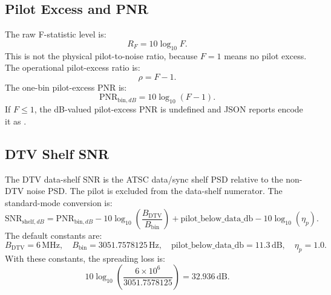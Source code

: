 \documentclass[10pt,letterpaper]{article}
\newcommand{\code}[1]{\texttt{\detokenize{#1}}}
\newcommand{\dB}{\,\mathrm{dB}}
\begin{document}
\subsection{Pilot Excess and PNR}

The raw F-statistic level is:
\begin{equation}
  R_F=10\log_{10}F.
\end{equation}
This is not the physical pilot-to-noise ratio, because \(F=1\) means no pilot excess.  The operational pilot-excess ratio is:
\begin{equation}
  \boxed{\rho=F-1.}
\end{equation}
The one-bin pilot-excess PNR is:
\begin{equation}
  \boxed{\mathrm{PNR}_{\mathrm{bin},dB}=10\log_{10}(F-1).}
\end{equation}
If \(F\leq 1\), the dB-valued pilot-excess PNR is undefined and JSON reports encode it as \code{null}.

\subsection{DTV Shelf SNR}

The DTV data-shelf SNR is the ATSC data/sync shelf PSD relative to the non-DTV noise PSD.  The pilot is excluded from the data-shelf numerator.  The standard-mode conversion is:
\begin{equation}
  \boxed{\mathrm{SNR}_{\mathrm{shelf},dB}=
  \mathrm{PNR}_{\mathrm{bin},dB}
  -10\log_{10}\left(\frac{B_{\mathrm{DTV}}}{B_{\mathrm{bin}}}\right)
  +\mathrm{pilot\_below\_data\_db}
  -10\log_{10}(\eta_p).}
\end{equation}
The default constants are:
\begin{equation}
 B_{\mathrm{DTV}}=6\,\mathrm{MHz},\quad
 B_{\mathrm{bin}}=3051.7578125\,\mathrm{Hz},\quad
 \mathrm{pilot\_below\_data\_db}=11.3\dB,
 \quad \eta_p=1.0.
\end{equation}
With these constants, the spreading loss is:
\begin{equation}
  10\log_{10}\left(\frac{6\times 10^6}{3051.7578125}\right)=32.936\dB.
\end{equation}
\end{document}
